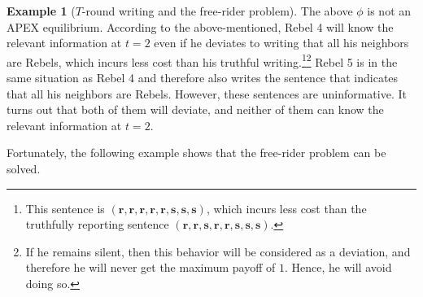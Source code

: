 \documentclass[12pt,letter]{article}
\newcommand\omicron{o}
\theoremstyle{definition}
\newtheorem{example}{Example}
\theoremstyle{remark}
\theoremstyle{claim}
\begin{document}
\begin{example}[$T$-round writing and the free-rider problem]
The above $\phi$ is not an APEX equilibrium. According to the above-mentioned, Rebel 4 will know the relevant information at $t=2$ even if he deviates to writing that all his neighbors are Rebels, which incurs less cost than his truthful writing.\footnote{This sentence is $(\textbf{r},\textbf{r},\textbf{r},\textbf{r},\textbf{r},\textbf{s},\textbf{s},\textbf{s})$, which incurs less cost than the truthfully reporting sentence $(\textbf{r},\textbf{r},\textbf{s},\textbf{r},\textbf{r},\textbf{s},\textbf{s},\textbf{s})$.}\footnote{If he remains silent, then this behavior will be considered as a deviation, and therefore he will never get the maximum payoff of $1$. Hence, he will avoid doing so.}
Rebel 5 is in the same situation as Rebel 4 and therefore also writes the sentence that indicates that all his neighbors are Rebels. However, these sentences are uninformative. It turns out that both of them will deviate, and neither of them can know the relevant information at $t=2$.


\end{example}

Fortunately, the following example shows that the free-rider problem can be solved. 
\end{document}
